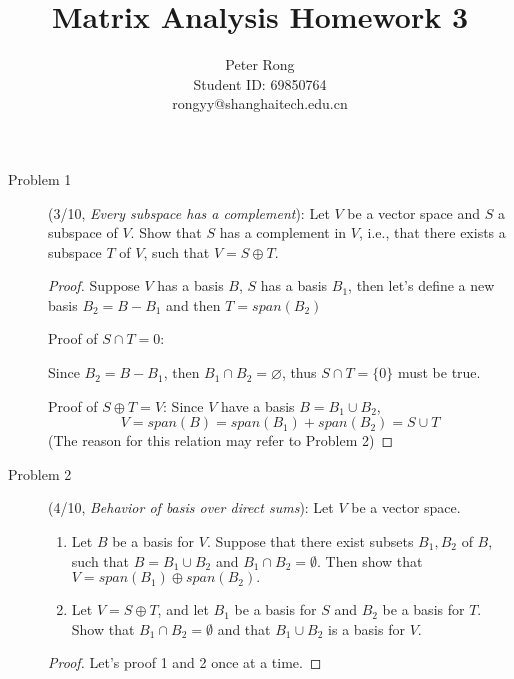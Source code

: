 \documentclass{article}
\title{Matrix Analysis Homework 3}
\author{Peter Rong \\ Student ID: 69850764 \\ rongyy@shanghaitech.edu.cn}
\begin{document}
\maketitle

\begin{description}


	\item[Problem 1] (3/10, \textit{Every subspace has a complement}):
	Let $V$ be a vector space and $S$ a subspace of $V$. Show that $S$ has a complement in $V$, i.e., that there exists a subspace $T$ of $V$, such that $V=S\oplus T$.
	\begin{proof}
		Suppose $V$ has a basis $B$, $S$ has a basis $B_1$, then let's define a new basis $B_2 = B - B_1$ and then $T = span(B_2)$
		\par Proof of $S \cap T = {0}$: 
			\par Since $B_2 = B - B_1$, then $B_1 \cap B_2 = \varnothing$, thus $S \cap T = \{0\}$ must be true.
		\par Proof of $S \oplus T = V$: 
			Since $V$ have a basis $B = B_1 \cup B_2$, 
			$$V = span(B) = span(B_1) + span(B_2) = S \cup T$$
			(The reason for this relation may refer to Problem 2)
	\end{proof}


	\item[Problem 2] (4/10, \textit{Behavior of basis over direct sums}):
	Let $V$ be a vector space.
	\begin{enumerate}
		\item Let $B$ be a basis for $V$. Suppose that there exist subsets $B_1, B_2$ of $B$, such that $B=B_1\cup B_2$ and $B_1\cap B_2=\emptyset.$ Then show that $V=span(B_1)\oplus span(B_2).$
		\item Let $V=S\oplus T$, and let $B_1$ be a basis for $S$ and $B_2$ be a basis for $T$. Show that $B_1\cap B_2=\emptyset$ and that $B_1\cup B_2$ is a basis for $V$.
	\end{enumerate}
	\begin{proof}
		Let's proof 1 and 2 once at a time.

\end{proof}
\end{description}
\end{document}
